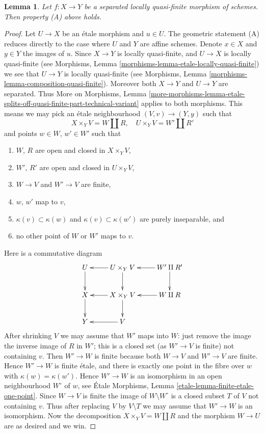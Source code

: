 \documentclass[10pt,a4paper]{amsart}
\theoremstyle{plain}
\newtheorem{lemma}[subsection]{Lemma}
\theoremstyle{definition}
\theoremstyle{remark}
\numberwithin{equation}{subsection}
\begin{document}
\begin{lemma}
\label{lemma-locally-quasi-finite-A}
Let $f : X \to Y$ be a separated locally quasi-finite morphism of schemes.
Then property (A) above holds.
\end{lemma}

\begin{proof}
Let $U \to X$ be an \'etale morphism and $u \in U$.
The geometric statement (A) reduces directly to the case where $U$ and $Y$
are affine schemes. Denote $x \in X$ and $y \in Y$ the
images of $u$. Since $X \to Y$ is locally quasi-finite, and $U \to X$ is
locally quasi-finite (see
Morphisms, Lemma \ref{morphisms-lemma-etale-locally-quasi-finite})
we see that $U \to Y$ is locally quasi-finite (see
Morphisms, Lemma \ref{morphisms-lemma-composition-quasi-finite}).
Moreover both $X \to Y$ and $U \to Y$ are separated. Thus
More on Morphisms, Lemma
\ref{more-morphisms-lemma-etale-splits-off-quasi-finite-part-technical-variant}
applies to both morphisms. This means we may pick an \'etale neighbourhood
$(V, v) \to (Y, y)$ such that
$$
X \times_Y V = W \amalg R, \quad
U \times_Y V = W' \amalg R'
$$
and points $w \in W$, $w' \in W'$ such that
\begin{enumerate}
\item $W$, $R$ are open and closed in $X \times_Y V$,
\item $W'$, $R'$ are open and closed in $U \times_Y V$,
\item $W \to V$ and $W' \to V$ are finite,
\item $w$, $w'$ map to $v$,
\item $\kappa(v) \subset \kappa(w)$ and $\kappa(v) \subset \kappa(w')$
are purely inseparable, and
\item no other point of $W$ or $W'$ maps to $v$.
\end{enumerate}
Here is a commutative diagram
$$
\xymatrix{
U \ar[d] & U \times_Y V \ar[l] \ar[d] & W' \amalg R' \ar[d] \ar[l] \\
X \ar[d] & X \times_Y V \ar[l] \ar[d] & W \amalg R \ar[l] \\
Y & V \ar[l]
}
$$
After shrinking $V$ we may assume that $W'$ maps into $W$:
just remove the image the inverse image of $R$ in $W'$; this is
a closed set (as $W' \to V$ is finite) not containing $v$.
Then $W' \to W$ is finite because both $W \to V$ and $W' \to V$ are finite.
Hence $W' \to W$ is finite \'etale, and there is exactly one point in the
fibre over $w$ with $\kappa(w) = \kappa(w')$. Hence $W' \to W$ is an
isomorphism in an open neighbourhood $W^\circ$ of $w$, see
\'Etale Morphisms, Lemma \ref{etale-lemma-finite-etale-one-point}.
Since $W \to V$ is finite the image of $W \setminus W^\circ$ is a closed
subset $T$ of $V$ not containing $v$. Thus after replacing $V$ by
$V \setminus T$ we may assume that $W' \to W$ is an isomorphism.
Now the decomposition $X \times_Y V = W \amalg R$ and the morphism
$W \to U$ are as desired and we win.
\end{proof}
\end{document}
